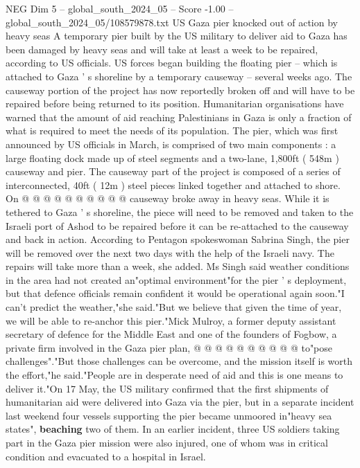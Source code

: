 \begin{textsample}{NEG Dim 5 – global\_south\_2024\_05 – Score -1.00 – global\_south\_2024\_05/108579878.txt}  \label{ex:f5_neg_381}
US Gaza pier knocked out of action by heavy seas A temporary pier built by the US military to deliver aid to Gaza has been damaged by heavy seas and will take at least a week to be repaired, according to US officials.
US forces began building the floating pier -- which is attached to Gaza ' s shoreline by a temporary causeway -- several weeks ago.
The causeway portion of the project has now reportedly broken off and will have to be repaired before being returned to its position.
Humanitarian organisations have warned that the amount of aid reaching Palestinians in Gaza is only a fraction of what is required to meet the needs of its population.
The pier, which was first announced by US officials in March, is comprised of two main components : a large floating dock made up of steel segments and a two-lane, 1,800ft ( 548m ) causeway and pier.
The causeway part of the project is composed of a series of interconnected, 40ft ( 12m ) steel pieces linked together and attached to shore.
On @ @ @ @ @ @ @ @ @ @ causeway broke away in heavy seas.
While it is tethered to Gaza ' s shoreline, the piece will need to be removed and taken to the Israeli port of Ashod to be repaired before it can be re-attached to the causeway and back in action.
According to Pentagon spokeswoman Sabrina Singh, the pier will be removed over the next two days with the help of the Israeli navy.
The repairs will take more than a week, she added.
Ms Singh said weather conditions in the area had not created an"optimal environment"for the pier ' s deployment, but that defence officials remain confident it would be operational again soon."I can't predict the weather,"she said."But we believe that given the time of year, we will be able to re-anchor this pier."Mick Mulroy, a former deputy assistant secretary of defence for the Middle East and one of the founders of Fogbow, a private firm involved in the Gaza pier plan, @ @ @ @ @ @ @ @ @ @ to"pose challenges"."But those challenges can be overcome, and the mission itself is worth the effort,"he said."People are in desperate need of aid and this is one means to deliver it."On 17 May, the US military confirmed that the first shipments of humanitarian aid were delivered into Gaza via the pier, but in a separate incident last weekend four vessels supporting the pier became unmoored in"heavy sea states", \textbf{beaching} two of them.
In an earlier incident, three US soldiers taking part in the Gaza pier mission were also injured, one of whom was in critical condition and evacuated to a hospital in Israel.

\end{textsample}

